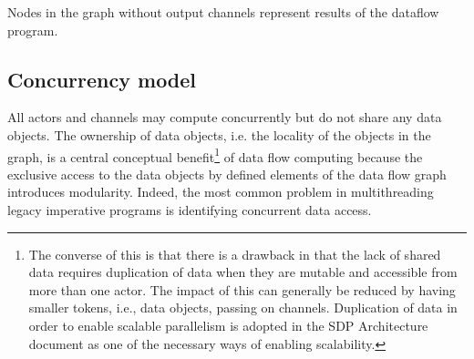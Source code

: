 \documentclass[11pt,a4paper]{article}
\begin{document}
Nodes in the graph without output channels represent results of the dataflow program.

\subsection{Concurrency model}
 
All actors and channels may compute concurrently but do not share any
data objects. The ownership of data objects, i.e. the locality of the
objects in the graph, is a central conceptual benefit\footnote{The
  converse of this is that there is a drawback in that the lack of
  shared data requires duplication of data when they are mutable and
  accessible from more than one actor. The impact of this can
  generally be reduced by having smaller tokens, i.e., data objects,
  passing on channels. Duplication of data in order to enable scalable
  parallelism is adopted in the SDP Architecture document as one of
  the necessary ways of enabling scalability.} of data flow computing
because the exclusive access to the data objects by defined elements
of the data flow graph introduces modularity. Indeed, the most common
problem in multithreading legacy imperative programs is identifying
concurrent data access.
\end{document}
